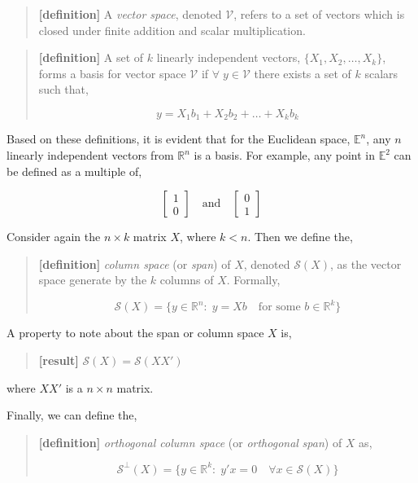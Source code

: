 \documentclass[
  letterpaper,
  DIV=11,
  numbers=noendperiod]{scrreprt}
\begin{document}
\begin{quote}
\textbf{{[}definition{]}} A \emph{vector space}, denoted
\(\mathcal{V}\), refers to a set of vectors which is closed under finite
addition and scalar multiplication.
\end{quote}

\begin{quote}
\textbf{{[}definition{]}} A set of \(k\) linearly independent vectors,
\(\{X_1,X_2,\dots,X_k\}\), forms a basis for vector space
\(\mathcal{V}\) if \(\forall\;y\in\mathcal{V}\) there exists a set of
\(k\) scalars such that,

\[
y=X_1b_1+X_2b_2+\ldots+X_kb_k
\]
\end{quote}

Based on these definitions, it is evident that for the Euclidean space,
\(\mathbb{E}^n\), any \(n\) linearly independent vectors from
\(\mathbb{R}^n\) is a basis. For example, any point in \(\mathbb{E}^2\)
can be defined as a multiple of,

\[
\begin{bmatrix}1\\0\end{bmatrix}\quad \text{and} \quad\begin{bmatrix}0\\1\end{bmatrix}
\]

Consider again the \(n\times k\) matrix \(X\), where \(k<n\). Then we
define the,

\begin{quote}
\textbf{{[}definition{]}} \emph{column space} (or \emph{span}) of \(X\),
denoted \(\mathcal{S}(X)\), as the vector space generate by the \(k\)
columns of \(X\). Formally,

\[
\mathcal{S}(X) = \{y\in\mathbb{R}^n:\;y=Xb\quad\text{for some }b\in \mathbb{R}^k\} 
\]
\end{quote}

A property to note about the span or column space \(X\) is,

\begin{quote}
\textbf{{[}result{]}} \(\mathcal{S}(X)=\mathcal{S}(XX')\)
\end{quote}

where \(XX'\) is a \(n\times n\) matrix.

Finally, we can define the,

\begin{quote}
\textbf{{[}definition{]}} \emph{orthogonal column space} (or
\emph{orthogonal} \emph{span}) of \(X\) as,

\[
\mathcal{S}^{\perp}(X) = \{y\in \mathbb{R}^k:\;y'x=0\quad \forall x\in\mathcal{S}(X)\}
\]
\end{quote}
\end{document}
